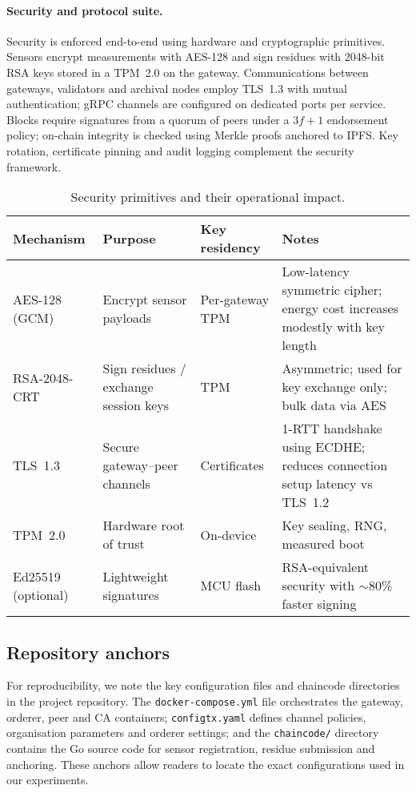 \documentclass[12pt,onecolumn]{IEEEtran} %
\begin{document}
\paragraph{Security and protocol suite.}
Security is enforced end-to-end using hardware and cryptographic primitives. Sensors encrypt measurements with AES-128 and sign residues with 2048-bit RSA keys stored in a TPM~2.0 on the gateway. Communications between gateways, validators and archival nodes employ TLS~1.3 with mutual authentication; gRPC channels are configured on dedicated ports per service. Blocks require signatures from a quorum of peers under a $3f+1$ endorsement policy; on-chain integrity is checked using Merkle proofs anchored to IPFS. Key rotation, certificate pinning and audit logging complement the security framework.

\begingroup
\setlength{\tabcolsep}{3pt}\footnotesize
\begin{table}[!t]
  \centering
  \caption{Security primitives and their operational impact.}
  \label{tab:security}
  \begin{tabularx}{\textwidth}{l l l X}
    \toprule
    \textbf{Mechanism} & \textbf{Purpose} & \textbf{Key residency} & \textbf{Notes} \\
    \midrule
    AES-128 (GCM) & Encrypt sensor payloads & Per-gateway TPM & Low-latency symmetric cipher; energy cost increases modestly with key length \\
    RSA-2048-CRT & Sign residues / exchange session keys & TPM & Asymmetric; used for key exchange only; bulk data via AES \\
    TLS~1.3 & Secure gateway–peer channels & Certificates & 1-RTT handshake using ECDHE; reduces connection setup latency vs TLS~1.2 \\
    TPM~2.0 & Hardware root of trust & On-device & Key sealing, RNG, measured boot \\
    Ed25519 (optional) & Lightweight signatures & MCU flash & RSA-equivalent security with $\sim$80\% faster signing \\
    \bottomrule
  \end{tabularx}
\end{table}
\endgroup

\subsection{Repository anchors}
For reproducibility, we note the key configuration files and chaincode directories in the project repository. The \texttt{docker-compose.yml} file orchestrates the gateway, orderer, peer and CA containers; \texttt{configtx.yaml} defines channel policies, organisation parameters and orderer settings; and the \texttt{chaincode/} directory contains the Go source code for sensor registration, residue submission and anchoring. These anchors allow readers to locate the exact configurations used in our experiments.
\end{document}
